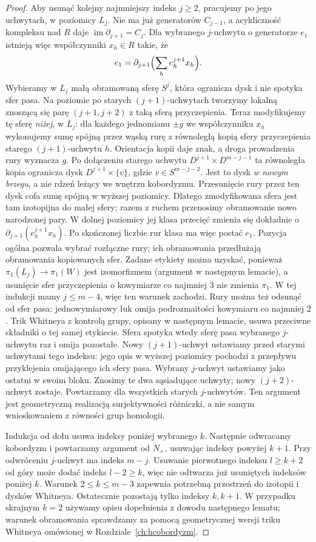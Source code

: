 \begin{proof}
Aby usunąć kolejny najmniejszy indeks $j\geq2$,
pracujemy po jego uchwytach, w poziomicy $L_j$.
Nie ma już generatorów $C_{j-1}$, a acykliczność
kompleksu nad $R$ daje
$\operatorname{im}\partial_{j+1}=C_j$.
Dla wybranego $j$-uchwytu o generatorze $e_1$
istnieją więc współczynniki $x_h\in R$ takie, że
\[
 e_1=\partial_{j+1}\Bigl(\sum_h e_h^{j+1}x_h\Bigr).
\]
Wybieramy w $L_j$ małą obramowaną sferę $S^j$,
która ogranicza dysk i nie spotyka sfer pasa.
Na poziomie po starych $(j+1)$-uchwytach
tworzymy lokalną znoszącą się parę
$(j+1,j+2)$ z taką sferą przyczepienia.
Teraz modyfikujemy tę sferę \emph{niżej},
w $L_j$: dla każdego jednomianu $\pm g$
we współczynniku $x_h$ wykonujemy sumę
spójną przez wąską rurę z równoległą kopią
sfery przyczepienia starego $(j+1)$-uchwytu
$h$. Orientacja kopii daje znak, a droga
prowadzenia rury wyznacza $g$.
Po dołączeniu starego uchwytu $D^{j+1}\times D^{m-j-1}$
ta równoległa kopia ogranicza dysk
$D^{j+1}\times\{v\}$, gdzie $v\in S^{m-j-2}$.
Jest to dysk \emph{w nowym brzegu}, a nie rdzeń leżący
we wnętrzu kobordyzmu. Przesunięcie rury przez ten dysk
cofa sumę spójną w wyższej poziomicy.
Dlatego zmodyfikowana sfera jest tam izotopijna do małej
sfery; razem z ruchem przenosimy obramowanie nowo narodzonej
pary. W dolnej poziomicy
jej klasa przecięć zmienia się dokładnie o
$\partial_{j+1}(e_h^{j+1}x_h)$.
Po skończonej liczbie rur klasa ma więc
postać $e_1$. Pozycja ogólna pozwala wybrać
rozłączne rury; ich obramowania przedłużają
obramowania kopiowanych sfer. Zadane etykiety można uzyskać,
ponieważ $\pi_1(L_j)\to\pi_1(W)$ jest izomorfizmem
(argument w następnym lemacie), a usunięcie sfer
przyczepienia o kowymiarze co najmniej $3$ nie zmienia $\pi_1$.
W tej indukcji mamy $j\leq m-4$, więc ten warunek zachodzi.
Rury można też odsunąć od sfer pasa: jednowymiarowy łuk
omija podrozmaitości kowymiaru co najmniej $2$.
Trik Whitneya z kontrolą grupy, opisany
w następnym lemacie, usuwa przeciwne składniki
o tej samej etykiecie. Sfera spotyka wtedy
sferę pasa wybranego $j$-uchwytu raz i omija
pozostałe. Nowy $(j+1)$-uchwyt ustawiamy przed starymi
uchwytami tego indeksu: jego opis w wyższej poziomicy
pochodzi z przepływu przyklejenia omijającego ich sfery pasa.
Wybrany $j$-uchwyt ustawiamy jako ostatni w swoim bloku.
Znosimy te dwa sąsiadujące uchwyty;
nowy $(j+2)$-uchwyt zostaje.
Powtarzamy dla wszystkich starych
$j$-uchwytów. Ten argument jest geometryczną
realizacją surjektywności różniczki, a nie
samym wnioskowaniem z równości grup homologii.

Indukcja od dołu usuwa indeksy poniżej wybranego
$k$. Następnie odwracamy kobordyzm i powtarzamy
argument od $N_+$, usuwając indeksy powyżej
$k+1$. Przy odwróceniu $j$-uchwyt ma indeks
$m-j$. Usuwanie pierwotnego indeksu $l\geq k+2$
od góry może dodać indeks $l-2\geq k$, więc nie odtwarza
już usuniętych indeksów poniżej $k$.
Warunek $2\leq k\leq m-3$ zapewnia
potrzebną przestrzeń do izotopii i dysków
Whitneya. Ostatecznie pozostają tylko
indeksy $k,k+1$. W przypadku skrajnym $k=2$
używamy opisu dopełnienia z dowodu
następnego lematu; warunek obramowania
sprawdzamy za pomocą geometrycznej wersji
triku Whitneya omówionej w
Rozdziale~\ref{ch:hcobordyzm}.
\end{proof}

